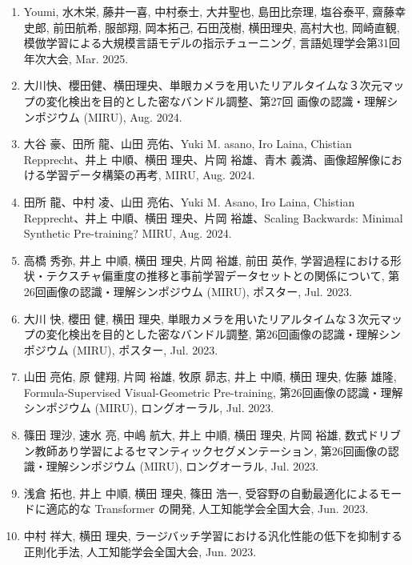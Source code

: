 \documentclass[margin,line]{cv}
\begin{document}
\begin{resume}
\begin{enumerate}
\item Youmi, 水木栄, 藤井一喜, 中村泰士, 大井聖也, 島田比奈理, 塩谷泰平, 齋藤幸史郎, 前田航希, 服部翔, 岡本拓己, 石田茂樹, 横田理央, 高村大也, 岡崎直観, 模倣学習による大規模言語モデルの指示チューニング, 言語処理学会第31回年次大会, Mar. 2025.

\item 大川快、櫻田健、横田理央、単眼カメラを用いたリアルタイムな３次元マップの変化検出を目的とした密なバンドル調整、第27回 画像の認識・理解シンポジウム (MIRU), Aug. 2024.

\item 大谷 豪、田所 龍、山田 亮佑、Yuki M. asano, Iro Laina, Chistian Repprecht、井上 中順、横田 理央、片岡 裕雄、青木 義満、画像超解像における学習データ構築の再考, MIRU, Aug. 2024.

\item 田所 龍、中村 凌、山田 亮佑、Yuki M. Asano, Iro Laina, Chistian Repprecht、井上 中順、横田 理央、片岡 裕雄、Scaling Backwards: Minimal Synthetic Pre-training? MIRU, Aug. 2024.

\item 高橋 秀弥, 井上 中順, 横田 理央, 片岡 裕雄, 前田 英作, 学習過程における形状・テクスチャ偏重度の推移と事前学習データセットとの関係について, 第26回画像の認識・理解シンポジウム (MIRU), ポスター, Jul. 2023.

\item 大川 快, 櫻田 健, 横田 理央, 単眼カメラを用いたリアルタイムな３次元マップの変化検出を目的とした密なバンドル調整, 第26回画像の認識・理解シンポジウム (MIRU), ポスター, Jul. 2023.

\item 山田 亮佑, 原 健翔, 片岡 裕雄, 牧原 昴志, 井上 中順, 横田 理央, 佐藤 雄隆, Formula-Supervised Visual-Geometric Pre-training, 第26回画像の認識・理解シンポジウム (MIRU), ロングオーラル, Jul. 2023.

\item 篠田 理沙, 速水 亮, 中嶋 航大, 井上 中順, 横田 理央, 片岡 裕雄,  数式ドリブン教師あり学習によるセマンティックセグメンテーション, 第26回画像の認識・理解シンポジウム (MIRU), ロングオーラル, Jul. 2023.

\item 浅倉 拓也, 井上 中順, 横田 理央, 篠田 浩一, 受容野の自動最適化によるモードに適応的な Transformer の開発, 人工知能学会全国大会, Jun. 2023.

\item 中村 祥大, 横田 理央, ラージバッチ学習における汎化性能の低下を抑制する正則化手法, 人工知能学会全国大会, Jun. 2023.


\end{enumerate}
\end{resume}
\end{document}

